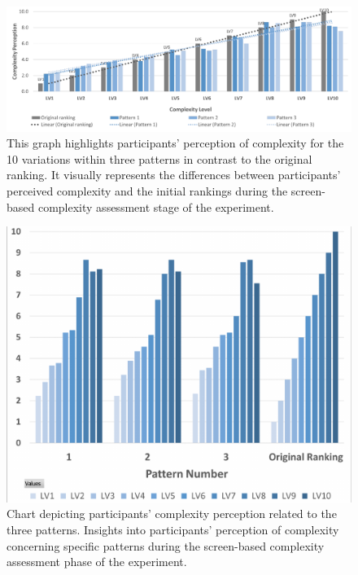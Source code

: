 

    \begin{figure}[htb]
      \centering
      \includegraphics[width= \linewidth, trim=0 0 0 0]{Images/ComplexityPerceptionPerLevel}
      \caption{This graph highlights participants' perception of complexity for the 10 variations within three patterns in contrast to the original ranking. It visually represents the differences between participants' perceived complexity and the initial rankings during the screen-based complexity assessment stage of the experiment.}
      \label{fig:ComplexityPerceptionPerLevel2}
    \end{figure}

    \begin{figure}[htb]
        \centering
        \includegraphics[width=\linewidth]{Images/ComplexityPerceptionChart}
        \caption{Chart depicting participants' complexity perception related to the three patterns. Insights into participants' perception of complexity concerning specific patterns during the screen-based complexity assessment phase of the experiment.}
        \label{fig:ComplexityPerceptionChart}
    \end{figure}


